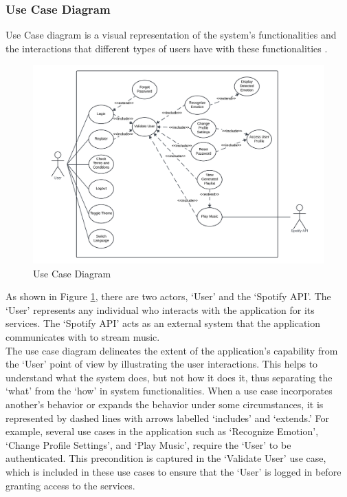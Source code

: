\subsubsection{Use Case Diagram}
Use Case diagram is a visual representation of the system's functionalities and the interactions that different types of users have with these functionalities \citep{ibm_2021_usecase}.
\begin{figure}[H]
    \centering
    \includegraphics[width=16cm]{Images/usecase.png}
    \caption{Use Case Diagram}
    \label{fig:usecase}
\end{figure}
\indent As shown in Figure \ref{fig:usecase}, there are two actors, `User' and the `Spotify API'.
The `User' represents any individual who interacts with the application for its services.
The `Spotify API' acts as an external system that the application communicates with to stream music.
\\
\indent The use case diagram delineates the extent of the application's capability from the `User' point of view by illustrating the user interactions.
This helps to understand what the system does, but not how it does it, thus separating the `what' from the `how' in system functionalities.
When a use case incorporates another's behavior or expands the behavior under some circumstances, it is represented by dashed lines with arrows labelled `includes' and `extends.'
For example, several use cases in the application such as `Recognize Emotion', `Change Profile Settings', and `Play Music', require the `User' to be authenticated.
This precondition is captured in the `Validate User' use case, which is included in these use cases to ensure that the `User' is logged in before granting access to the services.
\\
